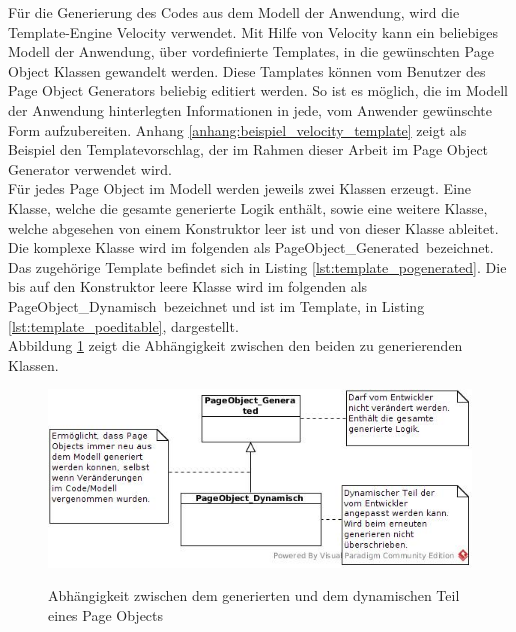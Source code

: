 Für die Generierung des Codes aus dem Modell der Anwendung, wird die Template-Engine Velocity \cite{apache_software_foundation_apache_2015} verwendet.
Mit Hilfe von Velocity kann ein beliebiges Modell der Anwendung, über vordefinierte Templates, in die gewünschten Page Object Klassen gewandelt werden.
Diese Tamplates können vom Benutzer des Page Object Generators beliebig editiert werden. So ist es möglich, die im Modell der Anwendung hinterlegten Informationen in jede, vom Anwender gewünschte Form aufzubereiten. Anhang \ref{anhang:beispiel_velocity_template} zeigt als Beispiel den Templatevorschlag, der im Rahmen dieser Arbeit im Page Object Generator verwendet wird.\\
Für jedes Page Object im Modell werden jeweils zwei Klassen erzeugt. Eine Klasse, welche die gesamte generierte Logik enthält, sowie eine weitere Klasse, welche abgesehen von einem Konstruktor leer ist und von dieser Klasse ableitet. 
Die komplexe Klasse wird im folgenden als \grq PageObject\_Generated\grq\ bezeichnet. Das zugehörige Template befindet sich in Listing \ref{lst:template_pogenerated}. Die
bis auf den Konstruktor leere Klasse wird im folgenden als \grq PageObject\_Dynamisch\grq\ bezeichnet und ist im Template, in Listing \ref{lst:template_poeditable}, dargestellt.\\
Abbildung \ref{fig:postruktur} zeigt die Abhängigkeit zwischen den beiden zu generierenden Klassen.

\begin{figure}[htb]
  \centering  
  \includegraphics[scale=0.6]{img/postruktur.jpg}\\
  \caption{Abhängigkeit zwischen dem generierten und dem dynamischen Teil eines Page Objects}
  \label{fig:postruktur}
\end{figure}
 
